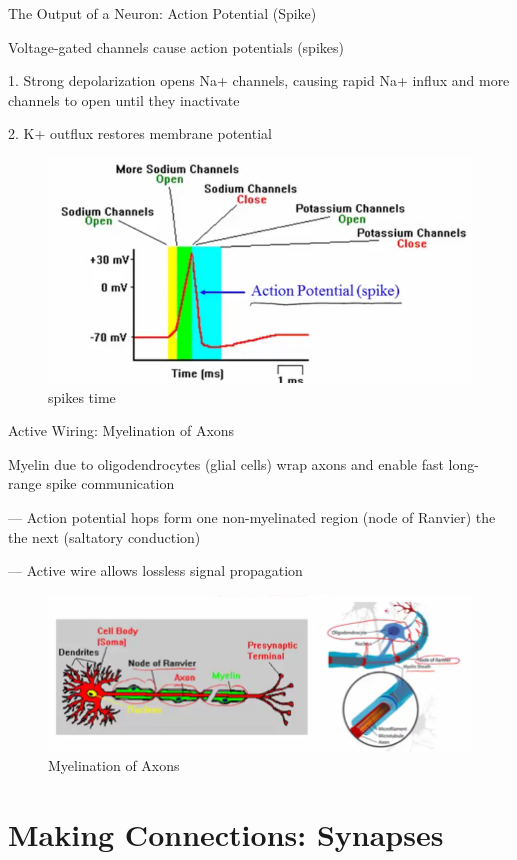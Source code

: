 \documentclass{book}
\begin{document}
The Output of a Neuron: Action Potential (Spike)

Voltage-gated channels cause action potentials (spikes)

1. Strong depolarization opens Na+ channels, causing rapid Na+ influx and more channels to open until they inactivate

2. K+ outflux restores membrane potential



\begin{figure}[h]
\centering
\includegraphics[width=0.7\linewidth]{./figures/spikes}
\caption{spikes time}
\label{fig:spikes}
\end{figure}


Active Wiring: Myelination of Axons

Myelin due to oligodendrocytes (glial cells) wrap axons and enable fast long-range spike communication

--- Action potential hops form one non-myelinated region (node of Ranvier) the the next (saltatory conduction)

--- Active wire allows lossless signal propagation

\begin{figure}[h]
\centering
\includegraphics[width=0.7\linewidth]{./figures/myelin}
\caption{Myelination of Axons}
\label{fig:myelin}
\end{figure}



\section{Making Connections: Synapses}
\end{document}
